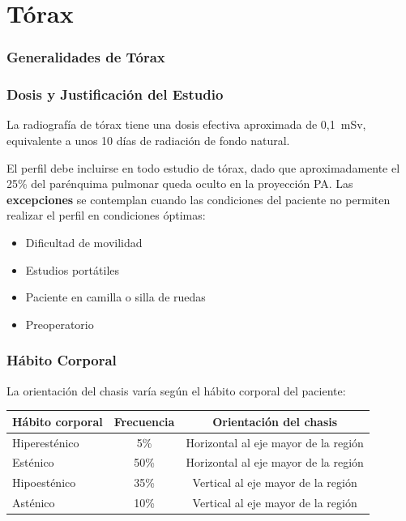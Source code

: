 \chapter{Tórax}
\subsection{Generalidades de Tórax}
\subsection*{Dosis y Justificación del Estudio}

La radiografía de tórax tiene una dosis efectiva aproximada de 0,1~mSv, equivalente
a unos 10 días de radiación de fondo natural.

El perfil debe incluirse en todo estudio de tórax, dado que aproximadamente el 25\%
del parénquima pulmonar queda oculto en la proyección PA. Las \textbf{excepciones} se
contemplan cuando las condiciones del paciente no permiten realizar el perfil en
condiciones óptimas:

\begin{itemize}
    \item Dificultad de movilidad
    \item Estudios portátiles
    \item Paciente en camilla o silla de ruedas
    \item Preoperatorio
\end{itemize}

\subsection*{Hábito Corporal}

La orientación del chasis varía según el hábito corporal del paciente:

\begin{table}[h]
\centering
\renewcommand{\arraystretch}{1.4}
\begin{tabular}{|l|c|c|}
\hline
\textbf{Hábito corporal} & \textbf{Frecuencia} & \textbf{Orientación del chasis} \\
\hline
Hiperesténico & 5\%  & Horizontal al eje mayor de la región \\
Esténico      & 50\% & Horizontal al eje mayor de la región \\
Hipoesténico  & 35\% & Vertical al eje mayor de la región   \\
Asténico      & 10\% & Vertical al eje mayor de la región   \\
\hline
\end{tabular}
\end{table}

